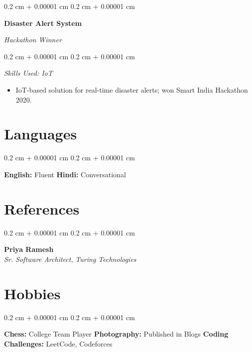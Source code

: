 \documentclass[10pt, letterpaper]{article}
\newenvironment{highlightsforbulletentries}{
        \begin{itemize}[
            topsep=0.10 cm,
            parsep=0.10 cm,
            partopsep=0pt,
            itemsep=0pt,
            leftmargin=10pt
        ]
    }{
        \end{itemize}
    }
\newenvironment{onecolentry}{
        \begin{adjustwidth}{
            0.2 cm + 0.00001 cm
        }{
            0.2 cm + 0.00001 cm
        }
    }{
        \end{adjustwidth}
    }
\newenvironment{twocolentry}[2][]{
        \onecolentry
        \def\secondColumn{#2}
        \setcolumnwidth{\fill, 4.5 cm}
        \begin{paracol}{2}
    }{
        \switchcolumn \raggedleft \secondColumn
        \end{paracol}
        \endonecolentry
    }
\begin{document}
            \vspace{0.2 cm}
            \begin{twocolentry}{    
            \textit{Hackathon Winner}}
            \textbf{Disaster Alert System}
            \end{twocolentry}
            \vspace{0.10 cm}
            \begin{onecolentry}
            \textit{Skills Used: IoT}
                \begin{highlightsforbulletentries}
                            \item IoT-based solution for real-time disaster alerts; won Smart India Hackathon 2020.
                            \vspace{-2pt}
                \end{highlightsforbulletentries}
            \end{onecolentry}

            \vspace{0.2 cm}
        \section{Languages}
        \begin{onecolentry}
        
                \textbf{English:} Fluent
                \textbf{Hindi:} Conversational
        \end{onecolentry}
        \vspace{0.1 cm}
        \section{References}
                \begin{onecolentry}
                    \textbf{Priya Ramesh}
                    \vspace{0.10 cm}
                        \hfill{ \color{black} \faEnvelope[regular]}    \\
                    \textit{Sr. Software Architect,}
                    \textit{Turing Technologies} 
                        \hfill{ \color{black} \faPhone*}  
                        \vspace{5pt} \\
                \end{onecolentry}
                \vspace{0.2 cm}
        \section{Hobbies}
        \begin{onecolentry}
                \textbf{Chess:} College Team Player
                \textbf{Photography:} Published in Blogs
                \textbf{Coding Challenges:} LeetCode, Codeforces
        \end{onecolentry}
        \vspace{0.1 cm}
\end{document}
